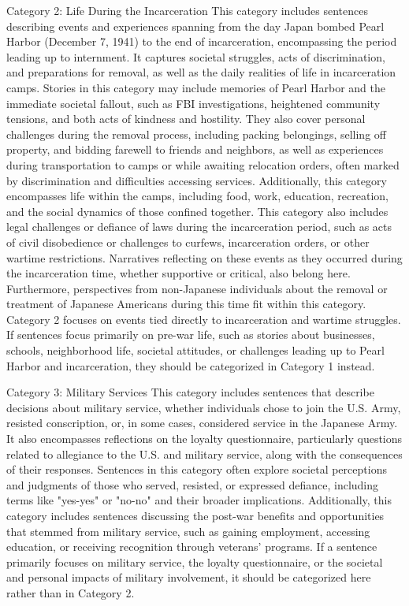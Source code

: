 Category 2: Life During the Incarceration
This category includes sentences describing events and experiences spanning from the day Japan bombed Pearl Harbor (December 7, 1941) to the end of incarceration, encompassing the period leading up to internment. It captures societal struggles, acts of discrimination, and preparations for removal, as well as the daily realities of life in incarceration camps. Stories in this category may include memories of Pearl Harbor and the immediate societal fallout, such as FBI investigations, heightened community tensions, and both acts of kindness and hostility. They also cover personal challenges during the removal process, including packing belongings, selling off property, and bidding farewell to friends and neighbors, as well as experiences during transportation to camps or while awaiting relocation orders, often marked by discrimination and difficulties accessing services. Additionally, this category encompasses life within the camps, including food, work, education, recreation, and the social dynamics of those confined together.
This category also includes legal challenges or defiance of laws during the incarceration period, such as acts of civil disobedience or challenges to curfews, incarceration orders, or other wartime restrictions. Narratives reflecting on these events as they occurred during the incarceration time, whether supportive or critical, also belong here. Furthermore, perspectives from non-Japanese individuals about the removal or treatment of Japanese Americans during this time fit within this category.
Category 2 focuses on events tied directly to incarceration and wartime struggles. If sentences focus primarily on pre-war life, such as stories about businesses, schools, neighborhood life, societal attitudes, or challenges leading up to Pearl Harbor and incarceration, they should be categorized in Category 1 instead.

Category 3: Military Services
This category includes sentences that describe decisions about military service, whether individuals chose to join the U.S. Army, resisted conscription, or, in some cases, considered service in the Japanese Army. It also encompasses reflections on the loyalty questionnaire, particularly questions related to allegiance to the U.S. and military service, along with the consequences of their responses. Sentences in this category often explore societal perceptions and judgments of those who served, resisted, or expressed defiance, including terms like "yes-yes" or "no-no" and their broader implications.
Additionally, this category includes sentences discussing the post-war benefits and opportunities that stemmed from military service, such as gaining employment, accessing education, or receiving recognition through veterans' programs. If a sentence primarily focuses on military service, the loyalty questionnaire, or the societal and personal impacts of military involvement, it should be categorized here rather than in Category 2. 

